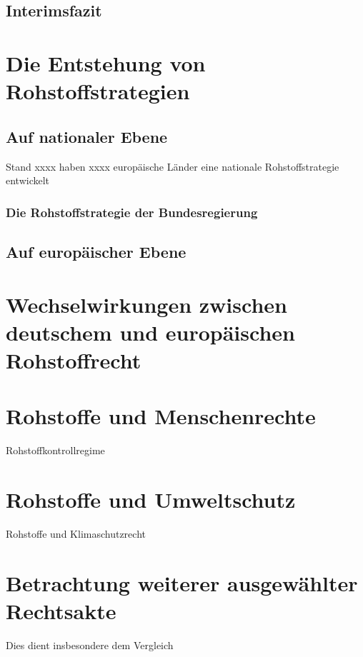 \documentclass[12pt,a4paper,oneside]{book} %
\begin{document}
	\subsection{Interimsfazit}
	
	\section{Die Entstehung von Rohstoffstrategien}
	
	\subsection{Auf nationaler Ebene}
	Stand xxxx haben xxxx europäische Länder eine nationale Rohstoffstrategie entwickelt
	
	\subsubsection{Die Rohstoffstrategie der Bundesregierung}
	
	\subsection{Auf europäischer Ebene}
	
	\section{Wechselwirkungen zwischen deutschem und europäischen Rohstoffrecht}
	
	\section{Rohstoffe und Menschenrechte}
	
	Rohstoffkontrollregime
	
	\section{Rohstoffe und Umweltschutz}
	
	Rohstoffe und Klimaschutzrecht
	
	
	\section{Betrachtung weiterer ausgewählter Rechtsakte}
	
	Dies dient insbesondere dem Vergleich 
	
\end{document}

